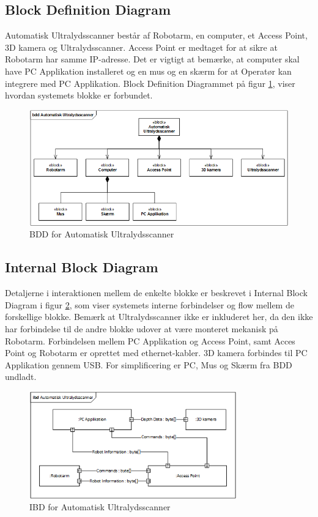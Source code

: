 \subsection{Block Definition Diagram}
Automatisk Ultralydsscanner består af Robotarm, en computer, et Access Point, 3D kamera og Ultralydsscanner. Access Point er medtaget for at sikre at Robotarm har samme IP-adresse. Det er vigtigt at bemærke, at computer skal have PC Applikation installeret og en mus og en skærm for at Operatør kan integrere med PC Applikation. Block Definition Diagrammet på figur \ref{BDD}, viser hvordan systemets blokke er forbundet. 

\begin{figure}[H]
    \centering
    \includegraphics[width=1\textwidth]{figurer/d/Design/BDD}
    \caption{BDD for Automatisk Ultralydsscanner}
    \label{BDD}
\end{figure}

\subsection{Internal Block Diagram}
Detaljerne i interaktionen mellem de enkelte blokke er beskrevet i Internal Block Diagram i figur \ref{IBD}, som viser systemets interne forbindelser og flow mellem de forskellige blokke. Bemærk at Ultralydsscanner ikke er inkluderet her, da den ikke har forbindelse til de andre blokke udover at være monteret mekanisk på Robotarm. Forbindelsen mellem PC Applikation og Access Point, samt Acces Point og Robotarm er oprettet med ethernet-kabler. 3D kamera forbindes til PC Applikation gennem USB. For simplificering er PC, Mus og Skærm fra BDD undladt.

\begin{figure}[H]
    \centering
    \includegraphics[width=0.8\textwidth]{figurer/d/Design/IBD}
    \caption{IBD for Automatisk Ultralydsscanner}
    \label{IBD}
\end{figure}

